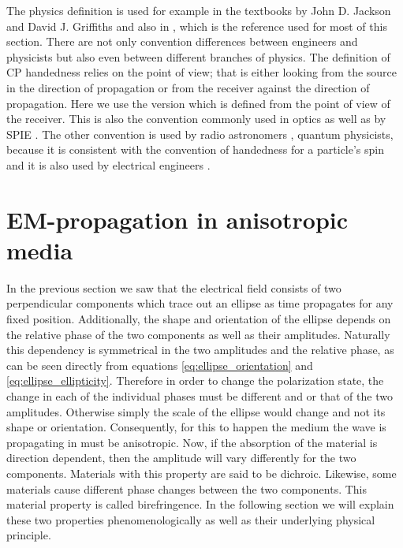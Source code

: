 The physics definition is used for example in the textbooks by John D. Jackson \cite{Jackson1998ClassicalEdition} and David J. Griffiths \cite{Griffiths2017IntroductionElectrodynamics} and also in \cite{Collett2009FieldPolarization}, which is the reference used for most of this section.
There are not only convention differences between engineers and physicists but also even between different branches of physics. The definition of CP handedness relies on the point of view; that is either looking from the source in the direction of propagation or from the receiver against the direction of propagation. Here we use the version which is defined from the point of view of the receiver. This is also the convention commonly used in optics \cite{Bass2016HandbookOptics, M.LandiDeglInnocenti2004PolarizationLines} as well as by SPIE \cite{Collett2009FieldPolarization}.
The other convention is used by radio astronomers \cite{1973CommissionAstronomie}, quantum physicists, because it is consistent with the convention of handedness for a particle's spin and it is also used by electrical engineers \cite{Orfanidis2004ElectromagneticAntennas}.

\section{EM-propagation in anisotropic media}
In the previous section we saw that the electrical field consists of two perpendicular components which trace out an ellipse as time propagates for any fixed position. Additionally, the shape and orientation of the ellipse depends on the relative phase of the two components as well as their amplitudes. Naturally this dependency is symmetrical in the two amplitudes and the relative phase, as can be seen directly from equations \ref{eq:ellipse_orientation} and \ref{eq:ellipse_ellipticity}. Therefore in order to change the polarization state, the change in each of the individual phases must be different and or that of the two amplitudes. Otherwise simply the scale of the ellipse would change and not its shape or orientation. Consequently, for this to happen the medium the wave is propagating in must be anisotropic. Now, if the absorption of the material is direction dependent, then the amplitude will vary differently for the two components. Materials with this property are said to be dichroic. Likewise, some materials cause different phase changes between the two components. This material property is called birefringence. In the following section we will explain these two properties phenomenologically as well as their underlying physical principle.

